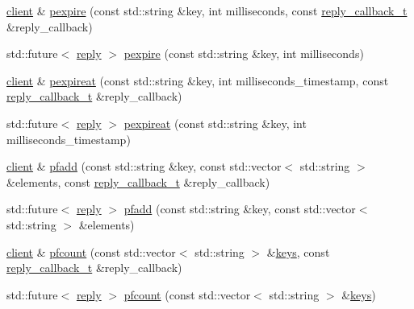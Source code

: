 \begin{DoxyCompactItemize}
\item 
\hyperlink{classcpp__redis_1_1client}{client} \& \hyperlink{classcpp__redis_1_1client_a8fc29a500492504985a714d9aaed8963}{pexpire} (const std\+::string \&key, int milliseconds, const \hyperlink{classcpp__redis_1_1client_a061a1140d36d2eaeda82b09a0bb3f9f2}{reply\+\_\+callback\+\_\+t} \&reply\+\_\+callback)
\item 
std\+::future$<$ \hyperlink{classcpp__redis_1_1reply}{reply} $>$ \hyperlink{classcpp__redis_1_1client_aa0974d486cae342eced35d64c6e68d40}{pexpire} (const std\+::string \&key, int milliseconds)
\item 
\hyperlink{classcpp__redis_1_1client}{client} \& \hyperlink{classcpp__redis_1_1client_a7c872e32ed28a78515c1711e4cafbabf}{pexpireat} (const std\+::string \&key, int milliseconds\+\_\+timestamp, const \hyperlink{classcpp__redis_1_1client_a061a1140d36d2eaeda82b09a0bb3f9f2}{reply\+\_\+callback\+\_\+t} \&reply\+\_\+callback)
\item 
std\+::future$<$ \hyperlink{classcpp__redis_1_1reply}{reply} $>$ \hyperlink{classcpp__redis_1_1client_af7aeaf2681d57fc30c8535c8d5df1e72}{pexpireat} (const std\+::string \&key, int milliseconds\+\_\+timestamp)
\item 
\hyperlink{classcpp__redis_1_1client}{client} \& \hyperlink{classcpp__redis_1_1client_ade84308f3ef8bfc75c092388ec538469}{pfadd} (const std\+::string \&key, const std\+::vector$<$ std\+::string $>$ \&elements, const \hyperlink{classcpp__redis_1_1client_a061a1140d36d2eaeda82b09a0bb3f9f2}{reply\+\_\+callback\+\_\+t} \&reply\+\_\+callback)
\item 
std\+::future$<$ \hyperlink{classcpp__redis_1_1reply}{reply} $>$ \hyperlink{classcpp__redis_1_1client_ac6534e0aaf0ef3c87e312b12fd1a5a97}{pfadd} (const std\+::string \&key, const std\+::vector$<$ std\+::string $>$ \&elements)
\item 
\hyperlink{classcpp__redis_1_1client}{client} \& \hyperlink{classcpp__redis_1_1client_acf88e97aac689b64af0e73843811d837}{pfcount} (const std\+::vector$<$ std\+::string $>$ \&\hyperlink{classcpp__redis_1_1client_acb7845a206b2321e6919c2f38282c322}{keys}, const \hyperlink{classcpp__redis_1_1client_a061a1140d36d2eaeda82b09a0bb3f9f2}{reply\+\_\+callback\+\_\+t} \&reply\+\_\+callback)
\item 
std\+::future$<$ \hyperlink{classcpp__redis_1_1reply}{reply} $>$ \hyperlink{classcpp__redis_1_1client_ad357677011d10800e2595db129bfbfff}{pfcount} (const std\+::vector$<$ std\+::string $>$ \&\hyperlink{classcpp__redis_1_1client_acb7845a206b2321e6919c2f38282c322}{keys})

\end{DoxyCompactItemize}
